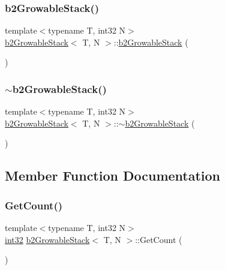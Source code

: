 \subsubsection{\texorpdfstring{b2GrowableStack()}{b2GrowableStack()}}
{\footnotesize\ttfamily template$<$typename T, int32 N$>$ \\
\mbox{\hyperlink{classb2_growable_stack}{b2\+Growable\+Stack}}$<$ T, N $>$\+::\mbox{\hyperlink{classb2_growable_stack}{b2\+Growable\+Stack}} (\begin{DoxyParamCaption}{ }\end{DoxyParamCaption})\hspace{0.3cm}{\ttfamily [inline]}}

\mbox{\label{classb2_growable_stack_a2b6265f7eef3e4be55b64db1f0cef4fd}} 
\subsubsection{\texorpdfstring{$\sim$b2GrowableStack()}{~b2GrowableStack()}}
{\footnotesize\ttfamily template$<$typename T, int32 N$>$ \\
\mbox{\hyperlink{classb2_growable_stack}{b2\+Growable\+Stack}}$<$ T, N $>$\+::$\sim$\mbox{\hyperlink{classb2_growable_stack}{b2\+Growable\+Stack}} (\begin{DoxyParamCaption}{ }\end{DoxyParamCaption})\hspace{0.3cm}{\ttfamily [inline]}}



\subsection{Member Function Documentation}
\mbox{\label{classb2_growable_stack_a3049e76ba7182b988450bfe94d30d5aa}} 
\subsubsection{\texorpdfstring{GetCount()}{GetCount()}}
{\footnotesize\ttfamily template$<$typename T, int32 N$>$ \\
\mbox{\hyperlink{b2_settings_8h_a43d43196463bde49cb067f5c20ab8481}{int32}} \mbox{\hyperlink{classb2_growable_stack}{b2\+Growable\+Stack}}$<$ T, N $>$\+::Get\+Count (\begin{DoxyParamCaption}{ }\end{DoxyParamCaption})\hspace{0.3cm}{\ttfamily [inline]}}

